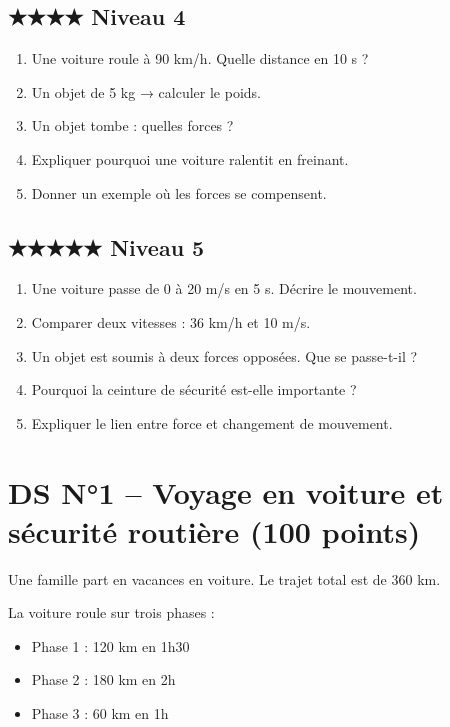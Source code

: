 \documentclass[11pt,a4paper]{article}
\begin{document}
\subsection*{★★★★ Niveau 4}

\begin{enumerate}[resume]
\item Une voiture roule à 90 km/h. Quelle distance en 10 s ?
\item Un objet de 5 kg → calculer le poids.
\item Un objet tombe : quelles forces ?
\item Expliquer pourquoi une voiture ralentit en freinant.
\item Donner un exemple où les forces se compensent.
\end{enumerate}

\subsection*{★★★★★ Niveau 5}

\begin{enumerate}[resume]
\item Une voiture passe de 0 à 20 m/s en 5 s. Décrire le mouvement.
\item Comparer deux vitesses : 36 km/h et 10 m/s.
\item Un objet est soumis à deux forces opposées. Que se passe-t-il ?
\item Pourquoi la ceinture de sécurité est-elle importante ?
\item Expliquer le lien entre force et changement de mouvement.
\end{enumerate}

\newpage
\newpage
\section*{DS N°1 – Voyage en voiture et sécurité routière (100 points)}

Une famille part en vacances en voiture.  
Le trajet total est de 360 km.

La voiture roule sur trois phases :
\begin{itemize}
\item Phase 1 : 120 km en 1h30
\item Phase 2 : 180 km en 2h
\item Phase 3 : 60 km en 1h
\end{itemize}
\end{document}
